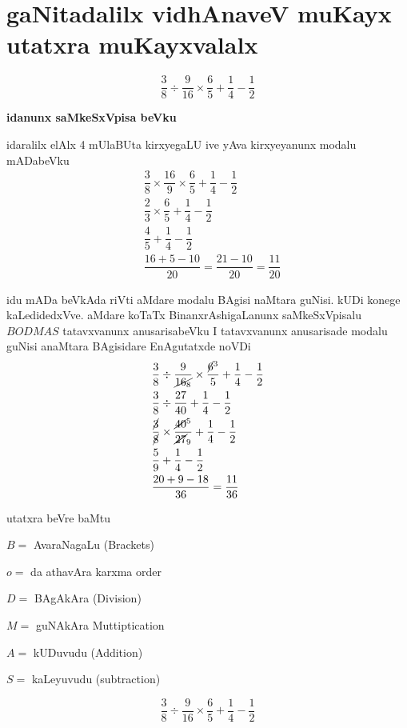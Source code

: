 \chapter{gaNitadalilx vidhAnaveV muKayx utatxra muKayxvalalx}

$$
\dfrac{3}{8}\div\dfrac{9}{16}\times\dfrac{6}{5}+\dfrac{1}{4}-\dfrac{1}{2}
$$

\textbf{idanunx saMkeSxVpisa beVku}

idaralilx elAlx {\rm 4} mUlaBUta kirxyegaLU ive yAva kirxyeyanunx modalu mADabeVku
\begin{align*}
& \dfrac{3}{8}\times\dfrac{16}{9}\times\dfrac{6}{5}+\dfrac{1}{4}-\dfrac{1}{2}\\
& \dfrac{2}{3}\times\dfrac{6}{5}+\dfrac{1}{4}-\dfrac{1}{2}\\
& \dfrac{4}{5}+\dfrac{1}{4}-\dfrac{1}{2}\\
& \dfrac{16+5-10}{20}=\dfrac{21-10}{20}=\dfrac{11}{20}
\end{align*}

idu mADa beVkAda riVti aMdare modalu BAgisi naMtara guNisi. kUDi konege kaLedidedxVve. aMdare koTaTx BinanxrAshigaLanunx saMkeSxVpisalu \quad $BODMAS$ \quad 
tatavxvanunx anusarisabeVku I tatavxvanunx anusarisade modalu guNisi anaMtara BAgisidare EnAgutatxde noVDi
\vfill\eject
\begin{align*}
& \dfrac{3}{8}\div \dfrac{9}{\cancel{16_8}}\times\dfrac{\cancel{6}^3}{5}+\dfrac{1}{4}-\dfrac{1}{2}\\
& \dfrac{3}{8}\div \dfrac{27}{40}+\dfrac{1}{4}-\dfrac{1}{2}\\
& \dfrac{\cancel{3}}{\cancel{8}}\times \dfrac{\cancel{40}^5}{\cancel{27}_9}+\dfrac{1}{4}-\dfrac{1}{2}\\
& \dfrac{5}{9}+\dfrac{1}{4}-\dfrac{1}{2}\\
& \dfrac{20+9-18}{36}=\dfrac{11}{36}
\end{align*}

utatxra beVre baMtu

$B=$ \quad AvaraNagaLu {\rm (Brackets)}

$o=$ \quad da athavAra karxma {\rm order}

$D=$ \quad BAgAkAra {\rm (Division)}

$M=$ \quad guNAkAra {\rm Muttiptication}

$A=$ \quad kUDuvudu {\rm (Addition)}

$S=$ \quad kaLeyuvudu {\rm (subtraction)}

$$
\dfrac{3}{8}\div\dfrac{9}{16}\times\dfrac{6}{5}+\dfrac{1}{4}-\dfrac{1}{2}
$$

